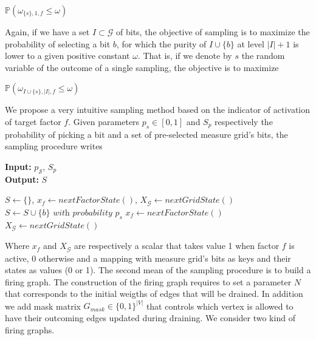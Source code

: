 \documentclass[a4paper, 11pt]{article}
\begin{document}
\begin{center}
$\mathbb{P}( \omega_{\{s\}, 1, f} \leq \omega)$
\end{center}  

Again, if we have a set $I \subset \mathcal{G}$ of bits, the objective of sampling is to maximize the probability of selecting a bit $b$, for which the purity of $I \cup \{b \}$ at level $\vert I \vert + 1$ is lower to a given positive constant $\omega$. That is, if we denote by $s$ the random variable of the outcome of a single sampling, the objective is to maximize

\begin{center}
$\mathbb{P}( \omega_{I \cup \{ s\}, \vert I \vert, f} \leq \omega)$
\end{center} 

We propose a very intuitive sampling method based on the indicator of activation of target factor $f$. Given parameters $p_s \in [0, 1]$ and $S_p$ respectively the probability of picking a bit and a set of pre-selected measure grid's bits, the sampling procedure writes

\begin{algorithm}[H]
\caption{Sampling}
\textbf{Input:} $p_{\mathcal{S}}$, $S_{p}$\\
\textbf{Output:} $S$
\begin{algorithmic}
\State $S \gets \{ \}$, $x_f \gets nextFactorState()$, $X_{\mathcal{G}} \gets nextGridState()$
    \State $S \gets S \cup \{ b \} \textit{ with probability } p_s$
   \EndIf	
  \EndFor	
 \EndIf
 \State $x_f \gets nextFactorState()$
 \State $X_{\mathcal{G}} \gets nextGridState()$
\EndWhile
\end{algorithmic}
\end{algorithm}

Where $x_f$ and $X_{\mathcal{G}}$ are respectively a scalar that takes value 1 when factor $f$ is active, 0 otherwise and a mapping with measure grid's bits as keys and their states as values (0 or 1). The second mean of the sampling procedure is to build a firing graph. The construction of the firing graph requires to set a parameter $N$ that corresponds to the initial weigths of edges that will be drained. In addition we add mask matrix $G_{mask} \in \{0, 1\}^{\vert V \vert}$ that controls which vertex is allowed to have their outcoming edges updated during draining. We consider two kind of firing graphs.
\end{document}
